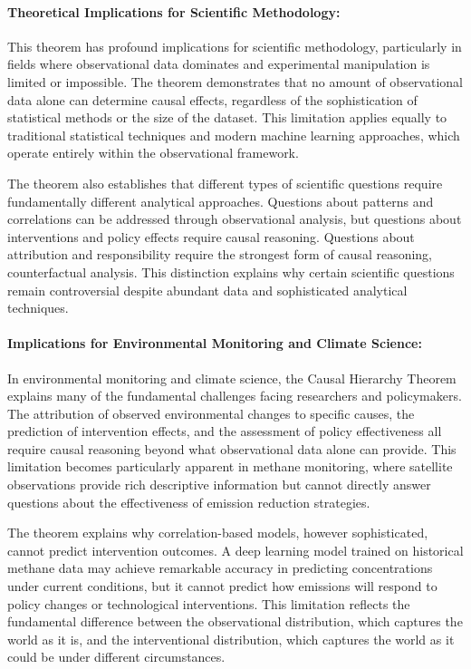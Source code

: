 \paragraph{Theoretical Implications for Scientific Methodology:}

This theorem has profound implications for scientific methodology, particularly in fields where observational data dominates and experimental manipulation is limited or impossible. The theorem demonstrates that no amount of observational data alone can determine causal effects, regardless of the sophistication of statistical methods or the size of the dataset. This limitation applies equally to traditional statistical techniques and modern machine learning approaches, which operate entirely within the observational framework.

The theorem also establishes that different types of scientific questions require fundamentally different analytical approaches. Questions about patterns and correlations can be addressed through observational analysis, but questions about interventions and policy effects require causal reasoning. Questions about attribution and responsibility require the strongest form of causal reasoning, counterfactual analysis. This distinction explains why certain scientific questions remain controversial despite abundant data and sophisticated analytical techniques.

\paragraph{Implications for Environmental Monitoring and Climate Science:}

In environmental monitoring and climate science, the Causal Hierarchy Theorem explains many of the fundamental challenges facing researchers and policymakers. The attribution of observed environmental changes to specific causes, the prediction of intervention effects, and the assessment of policy effectiveness all require causal reasoning beyond what observational data alone can provide. This limitation becomes particularly apparent in methane monitoring, where satellite observations provide rich descriptive information but cannot directly answer questions about the effectiveness of emission reduction strategies.

The theorem explains why correlation-based models, however sophisticated, cannot predict intervention outcomes. A deep learning model trained on historical methane data may achieve remarkable accuracy in predicting concentrations under current conditions, but it cannot predict how emissions will respond to policy changes or technological interventions. This limitation reflects the fundamental difference between the observational distribution, which captures the world as it is, and the interventional distribution, which captures the world as it could be under different circumstances.

